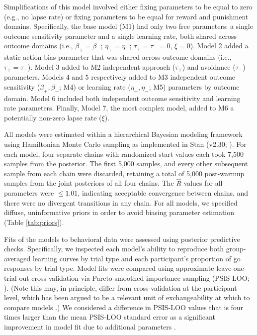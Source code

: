 \documentclass[a4paper,12pt]{article}
\begin{document}
\begin{refsection}[main]
Simplifications of this model involved either fixing parameters to be equal to zero (e.g., no lapse rate) or fixing parameters to be equal for reward and punishment domains. Specifically, the base model (M1) had only two free parameters: a single outcome sensitivity parameter and a single learning rate, both shared across outcome domains (i.e., $\beta_+ = \beta_-$; $\eta_+ = \eta_-$; $\tau_+ = \tau_- = 0$, $\xi = 0$). Model 2 added a static action bias parameter that was shared across outcome domains (i.e., $\tau_+ = \tau_-$). Model 3 added to M2 independent approach ($\tau_+$) and avoidance ($\tau_-$) parameters. Models 4 and 5 respectively added to M3 independent outcome sensitivity ($\beta_+, \beta_-$; M4) or learning rate ($\eta_+, \eta_-$; M5) parameters by outcome domain. Model 6 included both independent outcome sensitivity and learning rate parameters. Finally, Model 7, the most complex model, added to M6 a potentially non-zero lapse rate ($\xi$).

All models were estimated within a hierarchical Bayesian modeling framework using Hamiltonian Monte Carlo sampling as implemented in Stan (v2.30; \cite{carpenter2017stan}). For each model, four separate chains with randomized start values each took 7,500 samples from the posterior. The first 5,000 samples, and every other subsequent sample from each chain were discarded, retaining a total of 5,000 post-warmup samples from the joint posteriors of all four chains. The $\hat{R}$ values for all parameters were $\leq 1.01$, indicating acceptable convergence between chains, and there were no divergent transitions in any chain. For all models, we specified diffuse, uninformative priors in order to avoid biasing parameter estimation (Table \ref{tab:priors}).

Fits of the models to behavioral data were assessed using posterior predictive checks. Specifically, we inspected each model's ability to reproduce both group-averaged learning curves by trial type and each participant's proportion of go responses by trial type. Model fits were compared using approximate leave-one-trial-out cross-validation via Pareto smoothed importance sampling (PSIS-LOO; \cite{vehtari2017practical}). (Note this may, in principle, differ from cross-validation at the participant level, which has been argued to be a relevant unit of exchangeability at which to compare models \cite{stephan2009bayesian}.) We considered a difference in PSIS-LOO values that is four times larger than the mean PSIS-LOO standard error as a significant improvement in model fit due to additional parameters \cite{Vehtari_undated-tc}.


\end{refsection}
\end{document}
